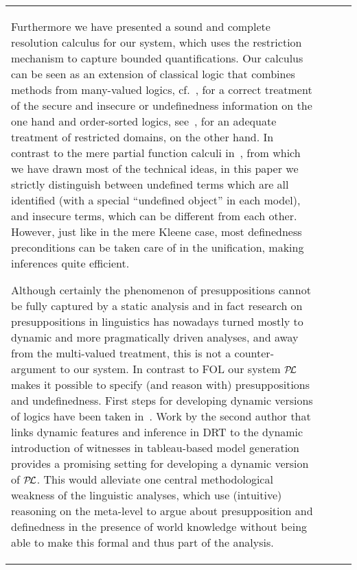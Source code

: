 \documentclass{\filespath jancl}
\def\presuppl{{\cal P\kern-.4ex L}}
\begin{document}
\begin{tabular}{l@{$\;\;$}ll@{$\;\;$}l}
Furthermore we have presented a sound and complete resolution calculus
for our system, which uses the restriction mechanism to capture bounded
quantifications. Our calculus can be seen as an extension of classical logic that combines
methods from many-valued logics, cf.~\cite{BaFe92,Haehnle:adimvl94}, for a correct
treatment of the secure and insecure or undefinedness information on the one
hand and
order-sorted logics, see~\cite{Weidenbach91}, for an adequate treatment of
restricted domains, on the other hand.  In contrast to the mere partial function calculi
in~\cite{KeKo94,KeKo:atcfpf96}, from which we have drawn most of the technical
ideas, in this paper we strictly distinguish between undefined terms which
are all identified (with a special ``undefined object'' in each model), and insecure terms, which can be different from
each other.  However, just like in the mere Kleene case, most definedness
preconditions can be taken care of in the unification, making inferences
quite efficient. 

Although certainly the phenomenon of presuppositions cannot be fully captured
by a static analysis and in fact research on presuppositions in linguistics
has nowadays turned mostly to dynamic and more pragmatically driven analyses, and
away from the multi-valued treatment, this is not a counter-argument to our
system. In contrast to FOL our system $\presuppl$ makes it possible to
specify (and reason with) presuppositions and undefinedness.
First steps for developing dynamic versions of logics have been taken
in~\cite{Saurer:andsfd93,ReyGab:ddcodrs94,MonRij:arcfds98}. Work by the
second author that links dynamic features and inference in DRT to the dynamic
introduction of witnesses in tableau-based model generation~\cite{Kohlhase:mgfdrt00}
provides a promising setting  for developing a
dynamic version of $\presuppl$. This would alleviate one central
methodological weakness of the linguistic analyses, which use (intuitive) reasoning on
the meta-level to argue about presupposition and definedness in the presence of world
knowledge without being able to make this formal and thus part of the analysis.

\newif\ifgerman\germanfalse\newif\iffrench\frenchfalse
\newcommand{\CADE}{{CADE}}
\newcommand{\IJCAI}{{IJCAI}}
\newcommand{\LPAR}{{LPAR}}
\newcommand{\JACM}{Journal of the ACM}
\newcommand{\JAR}{Journal of Automated Reasoning}
\newcommand{\JSL}{The Journal of Symbolic Logic}
\newcommand{\LNAI}{LNAI}
\newcommand{\PROC}{{Proceedings}}
\def\UdS{Universit\"at des Saarlandes}
\def\AddressUdS{Im Stadtwald, \Saarbruecken\Germany}
\def\UdSAddress{\AddressUdS}
\def\Saarbruecken{\ifgerman{Saar\-br\"ucken}\else{\iffrench{Sarrebruck}\else{Saar\-br\"ucken}\fi}\fi}
\def\FRANCE{\ifgerman{Frankreich}\else{France}\fi}
\def\GERMANY{\ifgerman{}\else{\iffrench{, Allemagne}\else{, Germany}\fi}\fi}\def\Germany{\GERMANY}
\def\NETHERLANDS{\ifgerman{Niederlande}\else{\iffrench{Pays Bas}\else{The Netherlands}\fi}\fi}
\def\RUSSIA{\ifgerman{Ru{\ss}land}\else{\iffrench{Russie}\else{Russia}\fi}\fi}




\end{tabular}
\end{document}
